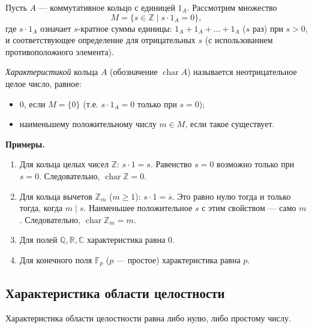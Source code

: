 \documentclass[a4paper,12pt]{article}
\theoremstyle{definition}
\theoremstyle{plain}
\theoremstyle{remark}
\begin{document}
	\begin{tcolorbox}[colback=blue!5, colframe=blue!40!black, title=Определение характеристики]
		Пусть \( A \) — коммутативное кольцо с единицей \( 1_A \). Рассмотрим множество
		\[
		M = \{ s \in \mathbb{Z} \mid s \cdot 1_A = 0 \},
		\]
		где \( s \cdot 1_A \) означает \( s \)-кратное суммы единицы: \( 1_A + 1_A + \dots + 1_A \) (\( s \) раз) при \( s > 0 \), и соответствующее определение для отрицательных \( s \) (с использованием противоположного элемента).
		
		\textit{Характеристикой} кольца \( A \) (обозначение \( \operatorname{char} A \)) называется неотрицательное целое число, равное:
		\begin{itemize}
			\item \( 0 \), если \( M = \{0\} \) (т.е. \( s \cdot 1_A = 0 \) только при \( s = 0 \));
			\item наименьшему положительному числу \( m \in M \), если такое существует.
		\end{itemize}
	\end{tcolorbox}
	
	\medskip
	\noindent \textbf{Примеры.}
	\begin{enumerate}
		\item Для кольца целых чисел \( \mathbb{Z} \): \( s \cdot 1 = s \). Равенство \( s = 0 \) возможно только при \( s = 0 \). Следовательно, \( \operatorname{char} \mathbb{Z} = 0 \).
		\item Для кольца вычетов \( \mathbb{Z}_m \) (\( m \geq 1 \)): \( s \cdot 1 = \overline{s} \). Это равно нулю тогда и только тогда, когда \( m \mid s \). Наименьшее положительное \( s \) с этим свойством — само \( m \). Следовательно, \( \operatorname{char} \mathbb{Z}_m = m \).
		\item Для полей \( \mathbb{Q}, \mathbb{R}, \mathbb{C} \) характеристика равна 0.
		\item Для конечного поля \( \mathbb{F}_p \) (\( p \) — простое) характеристика равна \( p \).
	\end{enumerate}
	
	\subsection{Характеристика области целостности}
	
	\begin{tcolorbox}[colback=green!5, colframe=green!50!black, title=Предложение]
		Характеристика области целостности равна либо нулю, либо простому числу.
	\end{tcolorbox}
	
\end{document}
